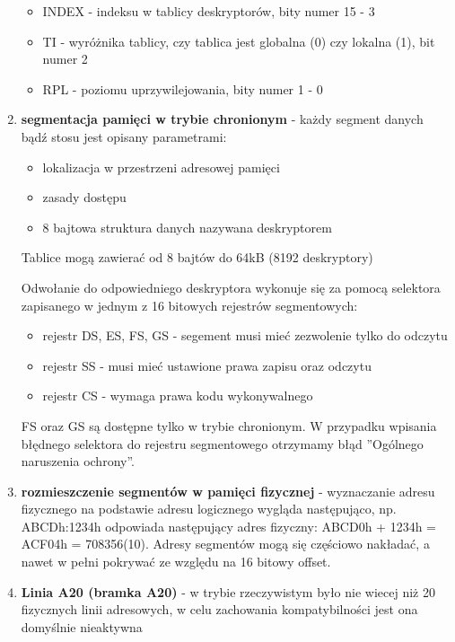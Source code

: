 \documentclass[a4paper,12pt]{article}
\begin{document}
\begin{enumerate}
\begin{itemize}
\item{INDEX - indeksu w tablicy deskryptorów, bity numer 15 - 3}
\item{TI - wyróżnika tablicy, czy tablica jest globalna (0) czy lokalna (1), bit numer 2}
\item{RPL - poziomu uprzywilejowania, bity numer 1 - 0}
\end{itemize}


\item{\textbf{segmentacja pamięci w trybie chronionym} - każdy segment danych bądź stosu jest opisany parametrami:
\begin{itemize}
\item{lokalizacja w przestrzeni adresowej pamięci}
\item{zasady dostępu}
\item{8 bajtowa struktura danych nazywana deskryptorem}
\end{itemize}
Tablice mogą zawierać od 8 bajtów do 64kB (8192 deskryptory)

Odwołanie do odpowiedniego deskryptora wykonuje się za pomocą selektora zapisanego w jednym z 16 bitowych rejestrów segmentowych: 

\begin{itemize}
\item{rejestr DS, ES, FS, GS - segement musi mieć zezwolenie tylko do odczytu}
\item{rejestr SS - musi mieć ustawione prawa zapisu oraz odczytu}
\item{rejestr CS - wymaga prawa kodu wykonywalnego}
\end{itemize}
FS oraz GS są dostępne tylko w trybie chronionym. W przypadku wpisania błędnego selektora do rejestru segmentowego otrzymamy błąd ''Ogólnego naruszenia ochrony''. }
	
\item{\textbf{rozmieszczenie segmentów w pamięci fizycznej} - wyznaczanie adresu fizycznego na podstawie adresu logicznego wygląda następująco, np. ABCDh:1234h odpowiada następujący adres fizyczny: ABCD0h + 1234h = ACF04h = 708356(10). Adresy segmentów mogą się częściowo nakładać, a nawet w pełni pokrywać ze względu na 16 bitowy offset. }


\item{\textbf{Linia A20 (bramka A20)} - w trybie rzeczywistym było nie wiecej niż 20 fizycznych linii adresowych, w celu zachowania kompatybilności jest ona domyślnie nieaktywna}


\end{enumerate}
\end{document}
